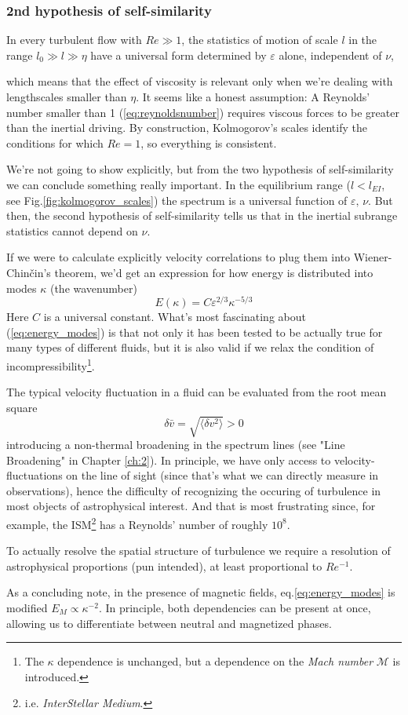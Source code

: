 \subsubsection*{2nd hypothesis of self-similarity}
In every turbulent flow with $Re \gg 1$, the statistics of motion of scale $l$ in the range $l_{0}\gg l \gg \eta $ have a universal form determined by $\varepsilon$ alone, independent of $\nu$,

which means that the effect of viscosity is relevant only when we're dealing with lengthscales smaller than $\eta$. It seems like a honest assumption: A Reynolds' number smaller than 1 (\ref{eq:reynoldsnumber}) requires viscous forces to be greater than the inertial driving. By construction, Kolmogorov's scales identify the conditions for which $Re = 1$, so everything is consistent.
\par We're not going to show explicitly, but from the two hypothesis of self-similarity we can conclude something really important. In the equilibrium range ($l<l_{EI}$, see Fig.\ref{fig:kolmogorov_scales}) the spectrum is a universal function of $\varepsilon,\,\nu$. But then, the second hypothesis of self-similarity tells us that in the inertial subrange statistics cannot depend on $\nu$. 
\par If we were to calculate explicitly velocity correlations to plug them into Wiener-Chinčin's theorem, we'd get an expression for how energy is distributed into modes $\kappa$ (the wavenumber)
\begin{equation}
    E(\kappa) = C \varepsilon^{2/3}\kappa^{-5/3}
    \label{eq:energy_modes}
\end{equation}
Here $C$ is a universal constant. What's most fascinating about (\ref{eq:energy_modes}) is that not only it has been tested to be actually true for many types of different fluids, but it is also valid if we relax the condition of incompressibility\footnote{The $\kappa$ dependence is unchanged, but a dependence on the \emph{Mach number} $\mathcal{M}$ is introduced.}.
\par The typical velocity fluctuation in a fluid can be evaluated from the root mean square 
\begin{equation*}
    \delta \bar{v} = \sqrt{\langle\delta v^{2}\rangle} > 0
\end{equation*}
introducing a non-thermal broadening in the spectrum lines (see "Line Broadening" in Chapter \ref{ch:2}). In principle, we have only access to velocity-fluctuations on the line of sight (since that's what we can directly measure in observations), hence the difficulty of recognizing the occuring of turbulence in most objects of astrophysical interest. And that is most frustrating since, for example, the ISM\footnote{i.e. \emph{InterStellar Medium}.} has a Reynolds' number of roughly $10^{8}$.
\par To actually resolve the spatial structure of turbulence we require a resolution of astrophysical proportions (pun intended), at least proportional to $Re^{-1}$.
\par As a concluding note, in the presence of magnetic fields, eq.\ref{eq:energy_modes} is modified $E_{M} \propto \kappa^{-2}$. In principle, both dependencies can be present at once, allowing us to differentiate between neutral and magnetized phases.
